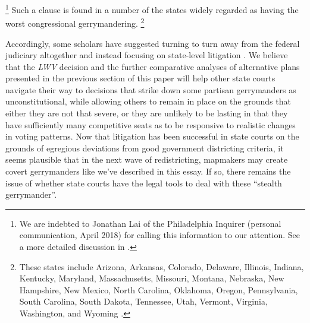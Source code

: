        \footnote{We are indebted to Jonathan Lai of the Philadelphia Inquirer (personal communication, April 2018) for calling this information to our attention. See a more detailed discussion in \citet{Elmendorf2018}.}
    Such a clause is found in a number of the states widely regarded as having the worst congressional gerrymandering. 
        \footnote{These states include Arizona, Arkansas, Colorado, Delaware, Illinois, Indiana, Kentucky, Maryland, Massachusetts, Missouri, Montana, Nebraska, New Hampshire, New Mexico, North Carolina, Oklahoma, Oregon, Pennsylvania, South Carolina, South Dakota, Tennessee, Utah, Vermont, Virginia, Washington, and Wyoming \citep[][footnote 86]{Douglas2014_RightToVote}.}
\par
    Accordingly, some scholars have suggested turning to turn away from the federal judiciary altogether and instead focusing on state-level litigation \citep{Wang_et_al_2019_Labortories_UPJCL}. We believe that the \textit{LWV} decision and the further comparative analyses of alternative plans presented in the previous section of this paper will help other state courts navigate their way to decisions that strike down some partisan gerrymanders as unconstitutional, while allowing others to remain in place on the grounds that either they are not that severe, or they are unlikely to be lasting in that they have sufficiently many competitive seats as to be responsive to realistic changes in voting patterns. Now that litigation has been successful in state courts on the grounds of egregious deviations from good government districting criteria, it seems plausible that in the next wave of redistricting, mapmakers may create covert gerrymanders like we've described in this essay. If so, there remains the issue of whether state courts have the legal tools to deal with these ``stealth gerrymander”.
